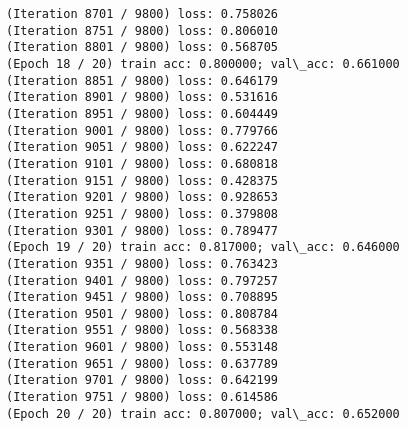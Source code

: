 \documentclass[11pt]{article}
\begin{document}
\begin{Verbatim}[commandchars=\\\{\}]
(Iteration 8701 / 9800) loss: 0.758026
(Iteration 8751 / 9800) loss: 0.806010
(Iteration 8801 / 9800) loss: 0.568705
(Epoch 18 / 20) train acc: 0.800000; val\_acc: 0.661000
(Iteration 8851 / 9800) loss: 0.646179
(Iteration 8901 / 9800) loss: 0.531616
(Iteration 8951 / 9800) loss: 0.604449
(Iteration 9001 / 9800) loss: 0.779766
(Iteration 9051 / 9800) loss: 0.622247
(Iteration 9101 / 9800) loss: 0.680818
(Iteration 9151 / 9800) loss: 0.428375
(Iteration 9201 / 9800) loss: 0.928653
(Iteration 9251 / 9800) loss: 0.379808
(Iteration 9301 / 9800) loss: 0.789477
(Epoch 19 / 20) train acc: 0.817000; val\_acc: 0.646000
(Iteration 9351 / 9800) loss: 0.763423
(Iteration 9401 / 9800) loss: 0.797257
(Iteration 9451 / 9800) loss: 0.708895
(Iteration 9501 / 9800) loss: 0.808784
(Iteration 9551 / 9800) loss: 0.568338
(Iteration 9601 / 9800) loss: 0.553148
(Iteration 9651 / 9800) loss: 0.637789
(Iteration 9701 / 9800) loss: 0.642199
(Iteration 9751 / 9800) loss: 0.614586
(Epoch 20 / 20) train acc: 0.807000; val\_acc: 0.652000

    \end{Verbatim}


    
    
    
    
\end{document}
